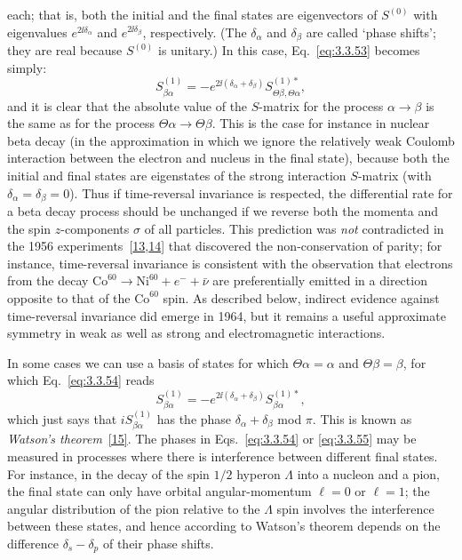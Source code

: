 each; that is, both the initial and the final states are eigenvectors of $S^{(0)}$
with eigenvalues $e^{2\ii\delta_\alpha}$ and $e^{2\ii\delta_\beta}$, respectively.
(The $\delta_\alpha$ and $\delta_\beta$ are called `phase shifts'; they are real
because $S^{(0)}$ is unitary.) In this case, Eq.~\eqref{eq:3.3.53} becomes simply:
\begin{equation}
S^{(1)}_{\beta\alpha}
=-e^{2\ii(\delta_\alpha+\delta_\beta)}
S^{(1)*}_{\Theta\beta,\Theta\alpha},
\tag{3.3.54}\label{eq:3.3.54}
\end{equation}
and it is clear that the absolute value of the $S$-matrix for the process
$\alpha\to\beta$ is the same as for the process
$\Theta\alpha\to\Theta\beta$. This is the case for instance in nuclear beta decay
(in the approximation in which we ignore the relatively weak Coulomb interaction
between the electron and nucleus in the final state), because both the initial and
final states are eigenstates of the strong interaction $S$-matrix (with
$\delta_\alpha=\delta_\beta=0$). Thus if time-reversal invariance is respected, the
differential rate for a beta decay process should be unchanged if we reverse both
the momenta and the spin $z$-components $\sigma$ of all particles. This prediction
was \textit{not} contradicted in the 1956 experiments~[\hyperref[ref:3.13]{13},\hyperref[ref:3.14]{14}] that discovered the
non-conservation of parity; for instance, time-reversal invariance is consistent
with the observation that electrons from the decay
$\mathrm{Co}^{60}\to\mathrm{Ni}^{60}+e^-+\bar\nu$ are preferentially emitted in
a direction opposite to that of the $\mathrm{Co}^{60}$ spin. As described below,
indirect evidence against time-reversal invariance did emerge in 1964, but it
remains a useful approximate symmetry in weak as well as strong and electromagnetic
interactions.

In some cases we can use a basis of states for which $\Theta\alpha=\alpha$ and
$\Theta\beta=\beta$, for which Eq.~\eqref{eq:3.3.54} reads
\begin{equation}
S^{(1)}_{\beta\alpha}
=-e^{2\ii(\delta_\alpha+\delta_\beta)}S^{(1)*}_{\beta\alpha},
\tag{3.3.55}\label{eq:3.3.55}
\end{equation}
which just says that $iS^{(1)}_{\beta\alpha}$ has the phase
$\delta_\alpha+\delta_\beta$ mod $\pi$. This is known as \textit{Watson's
theorem}~\hyperref[ref:3.15]{[15]}. The phases in Eqs.~\eqref{eq:3.3.54} or \eqref{eq:3.3.55} may be measured in
processes where there is interference between different final states. For instance,
in the decay of the spin $1/2$ hyperon $\Lambda$ into a nucleon and a pion, the
final state can only have orbital angular-momentum $\ell=0$ or $\ell=1$; the angular
distribution of the pion relative to the $\Lambda$ spin involves the interference
between these states, and hence according to Watson's theorem depends on the
difference $\delta_s-\delta_p$ of their phase shifts.


